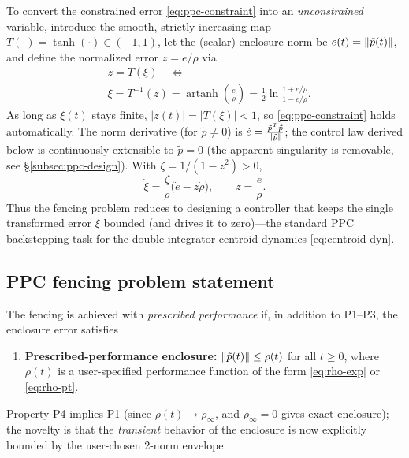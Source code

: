 To convert the constrained error \eqref{eq:ppc-constraint} into an
\emph{unconstrained} variable, introduce the smooth, strictly increasing map
$T(\cdot)=\tanh(\cdot)\in(-1,1)$, let the (scalar) enclosure norm be
$e(t)=\lVert \tilde p(t) \rVert$, and define the normalized error $z=e/\rho$ via
\[
\begin{aligned}
    &z = T(\xi)\quad\Longleftrightarrow
    \quad\\
    &\xi = T^{-1}(z)
    = \operatorname{artanh}\!\left(\frac{e}{\rho}\right)
    = \frac{1}{2}\ln\frac{1+e/\rho}{1-e/\rho}.
\end{aligned}
\]
As long as $\xi(t)$ stays finite, $|z(t)|=|T(\xi)|<1$, so
\eqref{eq:ppc-constraint} holds automatically. The norm derivative (for
$\tilde p\neq 0$) is $\dot e = \frac{\tilde p^T\dot{\tilde p}}{\lVert \tilde p \rVert}$;
the control law derived below is continuously extensible to $\tilde p=0$
(the apparent singularity is removable, see \S\ref{subsec:ppc-design}). With
$\zeta=1/(1-z^2)>0$,
\begin{equation}
    \dot\xi
    = \frac{\zeta}{\rho}
      \bigl(\dot e - z\dot\rho\bigr),
    \qquad z=\frac{e}{\rho}.
    \label{eq:xi-dyn}
\end{equation}
Thus the fencing problem reduces to designing a controller that keeps the
single transformed error $\xi$ bounded (and drives it to zero)---the
standard PPC backstepping task for the double-integrator centroid dynamics
\eqref{eq:centroid-dyn}.

\subsection{PPC fencing problem statement}

\begin{definition}
    \label{def:ppc-fencing}
    The fencing is achieved with \emph{prescribed performance} if, in
    addition to P1--P3, the enclosure error satisfies
    \begin{enumerate}
        \item[\textbf{P4}] \textbf{Prescribed-performance enclosure:}
        $\lVert \tilde p(t) \rVert \le \rho(t)$ for all $t\ge 0$, where
        $\rho(t)$ is a user-specified performance function of the form
        \eqref{eq:rho-exp} or \eqref{eq:rho-pt}.
    \end{enumerate}
    Property P4 implies P1 (since $\rho(t)\to\rho_\infty$, and
    $\rho_\infty=0$ gives exact enclosure); the novelty is that the
    \emph{transient} behavior of the enclosure is now explicitly bounded by
    the user-chosen 2-norm envelope.
\end{definition}

